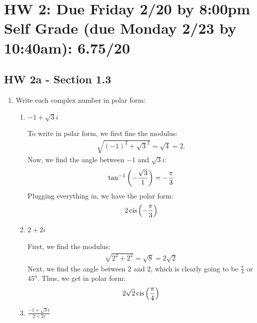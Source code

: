 
\newpage
\section*{HW 2: Due Friday 2/20 by 8:00pm \\ Self Grade (due Monday 2/23 by 10:40am): 6.75/20} 

\subsection*{HW 2a - Section 1.3} 
\begin{enumerate}
	\item Write each complex number in polar form:
	\begin{enumerate}
		\item $-1+\sqrt{3}i$
			\begin{problem}
				To write in polar form, we first fine the modulus:
				\begin{align*}
					\sqrt{(-1)^2 + \sqrt{3}^2} = \sqrt{4} = 2.
				\end{align*}
				Now, we find the angle between $-1$ and $\sqrt{3}i$:
				\begin{align*}
					\tan^{-1}\left(-\frac{\sqrt{3}}1\right)=-\frac{\pi}3
				\end{align*}
				Plugging everything in, we have the polar form:
			\begin{align*}
				2\,\text{cis}\left(-\frac{\pi}3\right)
			\end{align*}
			\end{problem}
			
		\item $2+2i$
			\begin{problem}
				First, we find the modulus:
				\begin{align*}
					\sqrt{2^2 + 2^2}= \sqrt{8}= 2\sqrt 2
				\end{align*}
				Next, we find the angle between 2 and 2, which is clearly going to be $\frac{\pi}4$ or $45^\text{o}$. \gline{}Thus, we get in polar form:
					\begin{align*}
						2\sqrt{2}\,\text{cis}\left(\frac{\pi}4\right)
					\end{align*}
			\end{problem}
			
		\item $\frac{-1+\sqrt{3}i}{2+2i}$
		

\end{enumerate}
\end{enumerate}
